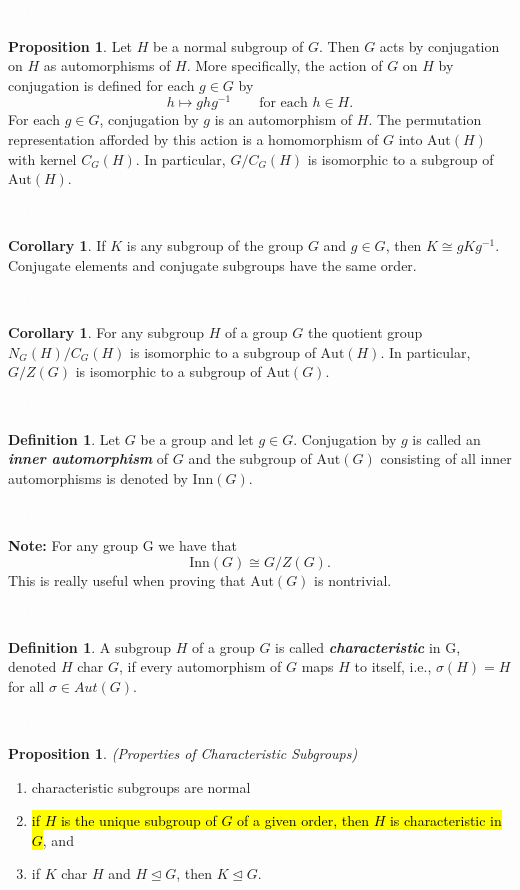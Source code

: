 \documentclass{article}
\theoremstyle{definition}
\newtheorem{prop}[thm]{Proposition}
\newtheorem{cor}[thm]{Corollary}
\newtheorem{defn}[thm]{Definition}
\newcommand{\nl}{\textcolor{white}{nothing}}
\newcommand{\inv}{^{-1}}
\newcommand{\Aut}{\text{Aut}}
\newcommand{\Inn}{\text{Inn}}
\begin{document}
\nl

\begin{prop}
Let $H$ be a normal subgroup of $G$. Then $G$ acts by conjugation on $H$ as automorphisms of $H$. More specifically, the action of $G$ on $H$ by conjugation is defined for each $g\in G$ by 
\[h\mapsto ghg\inv\qquad\text{for each } h\in H.\]
For each $g\in G$, conjugation by $g$ is an automorphism of $H$. The permutation representation afforded by this action is a homomorphism of $G$ into $\Aut(H)$ with kernel $C_G(H)$. In particular, $G/C_G(H)$ is isomorphic to a subgroup of $\Aut(H)$.
\end{prop}

\nl

\begin{cor}
If $K$ is any subgroup of the group $G$ and $g\in G$, then $K\cong gKg\inv$. Conjugate elements and conjugate subgroups have the same order.
\end{cor}

\nl

\begin{cor}
For any subgroup $H$ of a group $G$ the quotient group $N_G(H)/C_G(H)$ is isomorphic to a subgroup of $\Aut(H)$. In particular, $G/Z(G)$ is isomorphic to a subgroup of $\Aut(G)$.
\end{cor}

\nl

\begin{defn}
Let $G$ be a group and let $g\in G$. Conjugation by $g$ is called an \textbf{\textit{inner automorphism}} of $G$ and the subgroup of $\Aut(G)$ consisting of all inner automorphisms is denoted by $\Inn(G)$.
\end{defn}

\nl

\textbf{Note:} For any group G we have that 
\[\Inn(G)\cong G/Z(G).\]
This is really useful when proving that $\Aut(G)$ is nontrivial.

\nl

\begin{defn}
A subgroup $H$ of a group $G$ is called \textbf{\textit{characteristic}} in G, denoted $H$ char $G$, if every automorphism of $G$ maps $H$ to itself, i.e., $\sigma(H) = H$ for all $\sigma\in Aut(G)$.
\end{defn}

\nl

\begin{prop}\textit{(Properties of Characteristic Subgroups)}
\begin{enumerate}
\item characteristic subgroups are normal
\item \hl{if $H$ is the unique subgroup of $G$ of a given order, then $H$ is characteristic in $G$}, and 
\item if $K$ char $H$ and $H\unlhd G$, then $K\unlhd G$.
\end{enumerate}
\end{prop}
\end{document}
